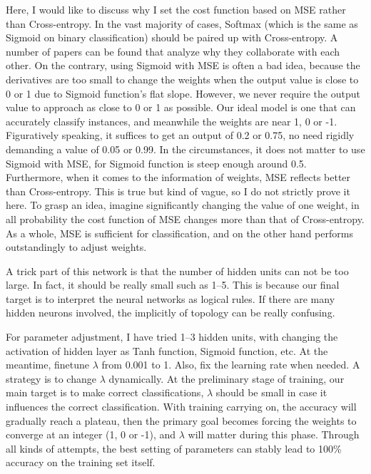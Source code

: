 \documentclass[runningheads]{llncs}
\begin{document}
Here, I would like to discuss why I set the cost function based on MSE rather than Cross-entropy. In the vast majority of cases, Softmax (which is the same as Sigmoid on binary classification) should be paired up with Cross-entropy. A number of papers can be found that analyze why they collaborate with each other. On the contrary, using Sigmoid with MSE is often a bad idea, because the derivatives are too small to change the weights when the output value is close to 0 or 1 due to Sigmoid function's flat slope. However, we never require the output value to approach as close to 0 or 1 as possible. Our ideal model is one that can accurately classify instances, and meanwhile the weights are near 1, 0 or -1. Figuratively speaking, it suffices to get an output of 0.2 or 0.75, no need rigidly demanding a value of 0.05 or 0.99. In the circumstances, it does not matter to use Sigmoid with MSE, for Sigmoid function is steep enough around 0.5. Furthermore, when it comes to the information of weights, MSE reflects better than Cross-entropy. This is true but kind of vague, so I do not strictly prove it here. To grasp an idea, imagine significantly changing the value of one weight, in all probability the cost function of MSE changes more than that of Cross-entropy. As a whole, MSE is sufficient for classification, and on the other hand performs outstandingly to adjust weights.

A trick part of this network is that the number of hidden units can not be too large. In fact, it should be really small such as 1--5. This is because our final target is to interpret the neural networks as logical rules. If there are many hidden neurons involved, the implicitly of topology can be really confusing.

For parameter adjustment, I have tried 1--3 hidden units, with changing the activation of hidden layer as Tanh function, Sigmoid function, etc. At the meantime, finetune $\lambda$ from 0.001 to 1. Also, fix the learning rate when needed. A strategy is to change $\lambda$ dynamically. At the preliminary stage of training, our main target is to make correct classifications, $\lambda$ should be small in case it influences the correct classification. With training carrying on, the accuracy will gradually reach a plateau, then the primary goal becomes forcing the weights to converge at an integer (1, 0 or -1), and $\lambda$ will matter during this phase. Through all kinds of attempts, the best setting of parameters can stably lead to 100\% accuracy on the training set itself.
\end{document}
